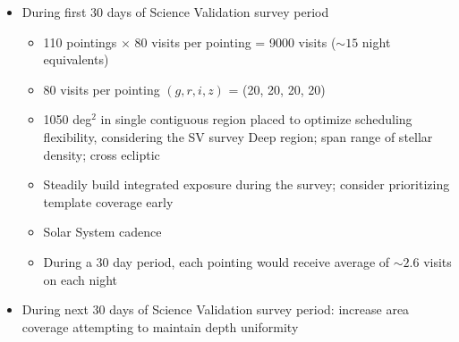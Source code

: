 \begin{itemize}

        \item During first 30 days of Science Validation survey period

        \begin{itemize}

                \item 110 pointings $\times$ 80 visits per pointing = 9000 visits ($\sim15$ night equivalents)
                \item 80 visits per pointing $(g, r, i, z)$ = (20, 20, 20, 20)
                \item 1050 deg$^2$  in single contiguous region placed to optimize scheduling flexibility, considering the SV survey Deep region; span range of stellar density; cross ecliptic
                \item Steadily build integrated exposure during the survey; consider prioritizing template coverage early
                \item Solar System cadence
                \item During a 30 day period, each pointing would receive average of $\sim2.6$ visits on each night

        \end{itemize}

        \item During next 30 days of Science Validation survey period: increase area coverage attempting to maintain depth uniformity

\end{itemize}



